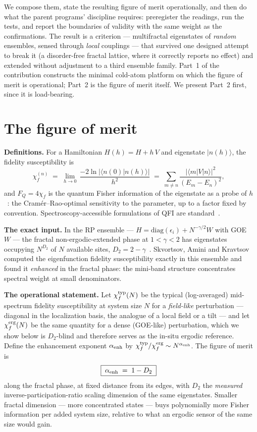 \documentclass[11pt]{article}
\newcommand{\chif}{\chi_{f}}
\begin{document}
We compose them, state the resulting figure of merit operationally, and then do what the parent
programs' discipline requires: preregister the readings, run the tests, and report the boundaries
of validity with the same weight as the confirmations. The result is a criterion --- multifractal
eigenstates of \emph{random} ensembles, sensed through \emph{local} couplings --- that survived one
designed attempt to break it (a disorder-free fractal lattice, where it correctly reports no
effect) and extended without adjustment to a third ensemble family. Part~1 of the contribution
constructs the minimal cold-atom platform on which the figure of merit is operational; Part~2 is
the figure of merit itself. We present Part~2 first, since it is load-bearing.

\section{The figure of merit}
\label{sec:fom}

\textbf{Definitions.} For a Hamiltonian $H(h) = H + h\,V$ and eigenstate $|n(h)\rangle$, the
fidelity susceptibility is
\[
\chif^{(n)} \;=\; \lim_{h\to0}\, \frac{-2\ln|\langle n(0)|n(h)\rangle|}{h^{2}}
\;=\; \sum_{m\neq n} \frac{|\langle m|V|n\rangle|^{2}}{(E_m-E_n)^{2}},
\]
and $F_Q = 4\chif$ is the quantum Fisher information of the eigenstate as a probe of
$h$~\cite{liu2014,safranek2017}: the Cram\'er--Rao-optimal sensitivity to the parameter, up to a
factor fixed by convention. Spectroscopy-accessible formulations of QFI are
standard~\cite{hauke2016}.

\textbf{The exact input.} In the RP ensemble --- $H = \mathrm{diag}(\epsilon_i) +
N^{-\gamma/2}W$ with GOE $W$ --- the fractal non-ergodic-extended phase at $1<\gamma<2$ has
eigenstates occupying $N^{D_2}$ of $N$ available sites, $D_2 = 2-\gamma$~\cite{kravtsov2015}.
Skvortsov, Amini and Kravtsov~\cite{sak2022} computed the eigenfunction fidelity susceptibility
exactly in this ensemble and found it \emph{enhanced} in the fractal phase: the mini-band structure
concentrates spectral weight at small denominators.

\textbf{The operational statement.} Let $\chif^{\rm typ}(N)$ be the typical (log-averaged)
mid-spectrum fidelity susceptibility at system size $N$ for a \emph{field-like} perturbation ---
diagonal in the localization basis, the analogue of a local field or a tilt --- and let
$\chif^{\rm erg}(N)$ be the same quantity for a dense (GOE-like) perturbation, which we show below
is $D_2$-blind and therefore serves as the in-situ ergodic reference. Define the enhancement
exponent $\alpha_{\rm enh}$ by $\chif^{\rm typ}/\chif^{\rm erg} \sim N^{\alpha_{\rm enh}}$. The
figure of merit is
\[
\boxed{\;\alpha_{\rm enh} \;=\; 1 - D_2\;}
\]
along the fractal phase, at fixed distance from its edges, with $D_2$ the \emph{measured}
inverse-participation-ratio scaling dimension of the same eigenstates. Smaller fractal dimension
--- more concentrated states --- buys polynomially more Fisher information per added system size,
relative to what an ergodic sensor of the same size would gain.
\end{document}
